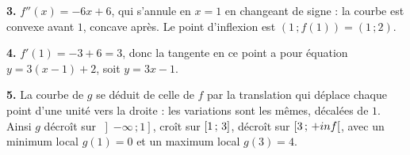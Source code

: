 \begin{corrige}
\textbf{3.} $f''(x) = -6x+6$, qui s'annule en $x = 1$ en changeant de signe :
la courbe est convexe avant $1$, concave après. Le point d'inflexion est
$\left(1\,;f(1)\right) = (1\,;2)$.

\textbf{4.} $f'(1) = -3+6 = 3$, donc la tangente en ce point a pour équation
$y = 3(x-1)+2$, soit $y = 3x-1$.

\textbf{5.} La courbe de $g$ se déduit de celle de $f$ par la translation qui
déplace chaque point d'une unité vers la droite : les variations sont les
mêmes, décalées de $1$. Ainsi $g$ décroît sur $\left]-\infty\,;1\right]$,
croît sur $\left[1\,;\,3\right]$, décroît sur $\left[3\,;\,+inf\right[$, avec
un minimum local $g(1) = 0$ et un maximum local $g(3) = 4$.
\end{corrige}
